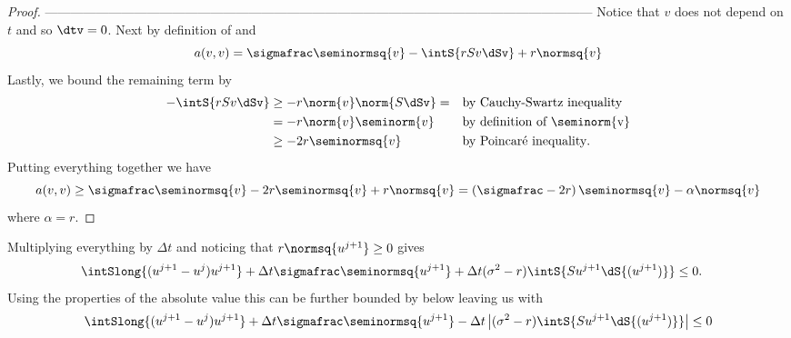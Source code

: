 \begin{prop}
\begin{proof}
        
        ---------------------------------------------------------------------------------------------------------------------------------
        Notice that $v$ does not depend on $t$ and so $\dtv = 0$. Next by definition of  and 
        \begin{equation*}
            a(v,v) = \sigmafrac \seminormsq{v} - \intS{r S v \dSv} + r \normsq{v}
        \end{equation*}
        Lastly, we bound the remaining term by
        \begin{align*}
            - \intS{r S v \dSv} &\geq -r \norm{v} \norm{S\dSv} = && \text{by Cauchy-Swartz inequality}\\
            &= -r \norm{v} \seminorm{v} && \text{by definition of \seminorm{v}}\\
            &\geq -2r \seminormsq{v} && \text{by Poincaré inequality}.
        \end{align*}
        Putting everything together we have
        \begin{equation*}
            a(v,v) \geq \sigmafrac \seminormsq{v} -2r \seminormsq{v} + r \normsq{v} = \left(\sigmafrac - 2r\right)\seminormsq{v} - \alpha \normsq{v}
        \end{equation*}
        where $\alpha = r$. \qedhere
    \end{proof}
\end{prop}





 Multiplying everything by $\Delta t$ and noticing that $r \normsq{u^{j+1}} \geq 0$ gives
    \begin{align*}
        &\intSlong{(u^{j+1} - u^j)  u^{j+1}} +\Delta t \sigmafrac \seminormsq{u^{j+1}} + \Delta t (\sigma^2 - r) \intS{S u^{j+1} \dS{(u^{j+1})}} \leq 0.
        \end{align*}
    Using the properties of the absolute value this can be further bounded by below leaving us with
    \begin{equation*}
        \intSlong{(u^{j+1} - u^j)  u^{j+1}} +\Delta t \sigmafrac \seminormsq{u^{j+1}} - \Delta t \left|(\sigma^2 - r) \intS{S u^{j+1} \dS{(u^{j+1})}} \right| \leq 0
    \end{equation*}



